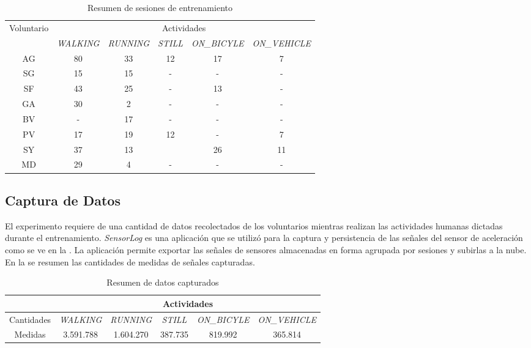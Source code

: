 \begin{table}[h]
\begin{centering}
\begin{tabular}{|c|c|c|c|c|c|}
\hline 
\multirow{2}{*}{Voluntario} & \multicolumn{5}{c|}{Actividades}\tabularnewline
\cline{2-6} 
 & \emph{WALKING} & \emph{RUNNING} & \emph{STILL} & \emph{ON\_BICYLE} & \emph{ON\_VEHICLE}\tabularnewline
\hline 
\hline 
AG & 80 & 33 & 12 & 17 & 7\tabularnewline
\hline 
SG & 15 & 15 & - & - & -\tabularnewline
\hline 
SF & 43 & 25 & - & 13 & -\tabularnewline
\hline 
GA & 30 & 2 & - & - & -\tabularnewline
\hline 
BV & - & 17 & - & - & -\tabularnewline
\hline 
PV & 17 & 19 & 12 & - & 7\tabularnewline
\hline 
SY & 37 & 13 &  & 26 & 11\tabularnewline
\hline 
MD & 29 & 4 & - & - & -\tabularnewline
\hline 
\end{tabular}
\par\end{centering}
\caption{\label{tab6:sesiones}Resumen de sesiones de entrenamiento}
\end{table}


\subsection{Captura de Datos}

El experimento requiere de una cantidad de datos recolectados de los
voluntarios mientras realizan las actividades humanas dictadas durante
el entrenamiento. \emph{SensorLog} \cite{Alan2014s} es una aplicación
 que se utilizó para la captura y persistencia de las
señales del sensor de aceleración como se ve en la .
La aplicación permite exportar las señales de sensores almacenadas
en forma agrupada por sesiones y subirlas a la nube. En la 
se resumen las cantidades de medidas de señales capturadas.

\begin{table}[h]
\begin{centering}
\begin{tabular}{|c|c|c|c|c|c|}
\hline 
 & \multicolumn{5}{c|}{Actividades}\tabularnewline
\hline 
Cantidades & \emph{WALKING} & \emph{RUNNING} & \emph{STILL} & \emph{ON\_BICYLE} & \emph{ON\_VEHICLE}\tabularnewline
\hline 
\hline 
Medidas & 3.591.788 & 1.604.270 & 387.735 & 819.992 & 365.814\tabularnewline
\hline 
\end{tabular}
\par\end{centering}
\caption{\label{tab6:captura}Resumen de datos capturados}
\end{table}


